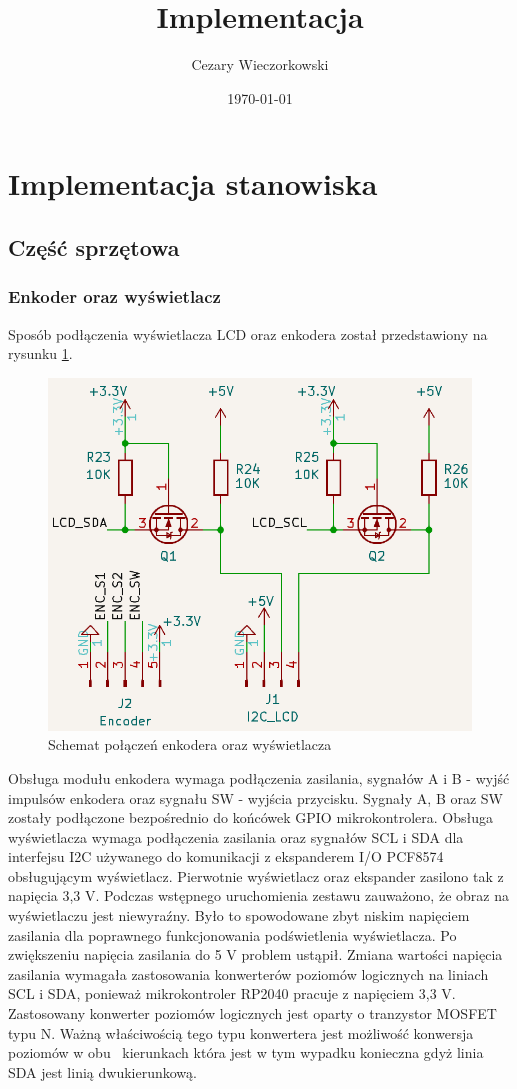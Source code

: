 \documentclass[../main.tex]{subfiles}
\author{Cezary Wieczorkowski}
\date{\today}
\title{Implementacja}
\begin{document}
\section{Implementacja stanowiska}

\subsection{Część sprzętowa}

\subsubsection{Enkoder oraz wyświetlacz}

Sposób podłączenia wyświetlacza LCD oraz enkodera został przedstawiony na rysunku \ref{fig:lcd_enc_connection}.

\begin{figure}[H]
    \centering
    \includegraphics[width=\linewidth]{lcd_schemat.png}
    \caption{Schemat połączeń enkodera oraz wyświetlacza}
    \label{fig:lcd_enc_connection}
\end{figure}

Obsługa modułu enkodera wymaga podłączenia zasilania, sygnałów A i B - wyjść impulsów enkodera oraz sygnału SW - wyjścia przycisku. 
Sygnały A, B oraz SW zostały podłączone bezpośrednio do końcówek GPIO mikrokontrolera. Obsługa wyświetlacza wymaga podłączenia 
zasilania oraz sygnałów SCL i SDA dla interfejsu I2C używanego do komunikacji z ekspanderem I/O PCF8574 obsługującym wyświetlacz. 
Pierwotnie wyświetlacz oraz ekspander zasilono tak z napięcia 3,3 V. Podczas wstępnego uruchomienia zestawu zauważono, że
obraz na wyświetlaczu jest niewyraźny. Było to spowodowane zbyt niskim napięciem zasilania dla poprawnego funkcjonowania podświetlenia
wyświetlacza. Po zwiększeniu napięcia zasilania do 5 V problem ustąpił. Zmiana wartości napięcia zasilania wymagała zastosowania
konwerterów poziomów logicznych na liniach SCL i SDA, ponieważ mikrokontroler RP2040 pracuje z napięciem 3,3 V. Zastosowany konwerter 
poziomów logicznych jest oparty o tranzystor MOSFET typu N. Ważną właściwością tego typu konwertera jest możliwość konwersja poziomów w obu \
kierunkach która jest w tym wypadku konieczna gdyż linia SDA jest linią dwukierunkową.
\end{document}

